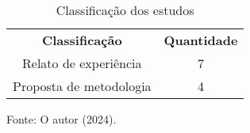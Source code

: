 \begin{table}[H]
\centering
\caption{Classificação dos estudos}
\begin{tabular}{cc}
\rowcolor[HTML]{C0C0C0} 
\textbf{Classificação}  & \textbf{Quantidade} \\
Relato de experiência   & 7                   \\
Proposta de metodologia & 4                   
\end{tabular}
\vspace{0.2cm}

{\centering Fonte: O autor (2024). \par}
\end{table}
